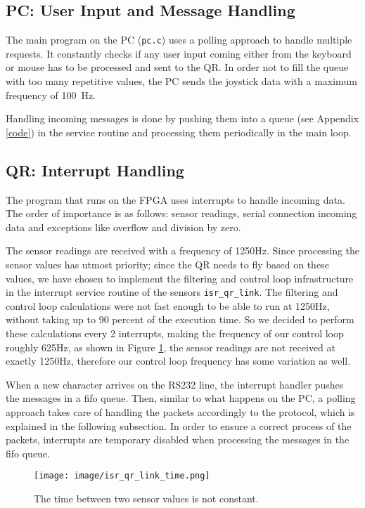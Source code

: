 \documentclass[a4paper]{article}
\begin{document}
\subsection{PC: User Input and Message Handling} %
The main program on the PC (\texttt{pc.c}) uses a polling approach to handle multiple requests. It constantly checks if any user input coming either from the keyboard or mouse has to be processed and sent to the QR. In order not to fill the queue with too many repetitive values, the PC sends the joystick data with a maximum frequency of \SI{100}{\hertz}.

Handling incoming messages is done by pushing them into a queue (see Appendix \ref{code}) in the service routine and processing them periodically in the main loop. 

\subsection{QR: Interrupt Handling} %
The program that runs on the FPGA uses interrupts to handle incoming data. The order of importance is as follows: sensor readings, serial connection incoming data and exceptions like overflow and division by zero.

The sensor readings are received with a frequency of 1250Hz. Since processing the sensor values has utmost priority; since the QR needs to fly based on these values, we have chosen to implement the filtering and control loop infrastructure in the interrupt service routine of the sensors \texttt{isr\_qr\_link}. The filtering and control loop calculations were not fast enough to be able to run at 1250Hz, without taking up to 90 percent of the execution time. So we decided to perform these calculations every 2 interrupts, making the frequency of our control loop roughly 625Hz, as shown in Figure \ref{fig:isrFreq}, the sensor readings are not received at exactly 1250Hz, therefore our control loop frequency has some variation as well.

When a new character arrives on the RS232 line, the interrupt handler pushes the messages in a fifo queue. Then, similar to what happens on the PC, a polling approach takes care of handling the packets accordingly to the protocol, which is explained in the following subsection. In order to ensure a correct process of the packets, interrupts are temporary disabled when processing the messages in the fifo queue.

\begin{figure}[h!]
  \centering
  \texttt{[image: image/isr\_qr\_link\_time.png]}
  \caption{The time between two sensor values is not constant.}
  \label{fig:isrFreq}
\end{figure}
\end{document}
